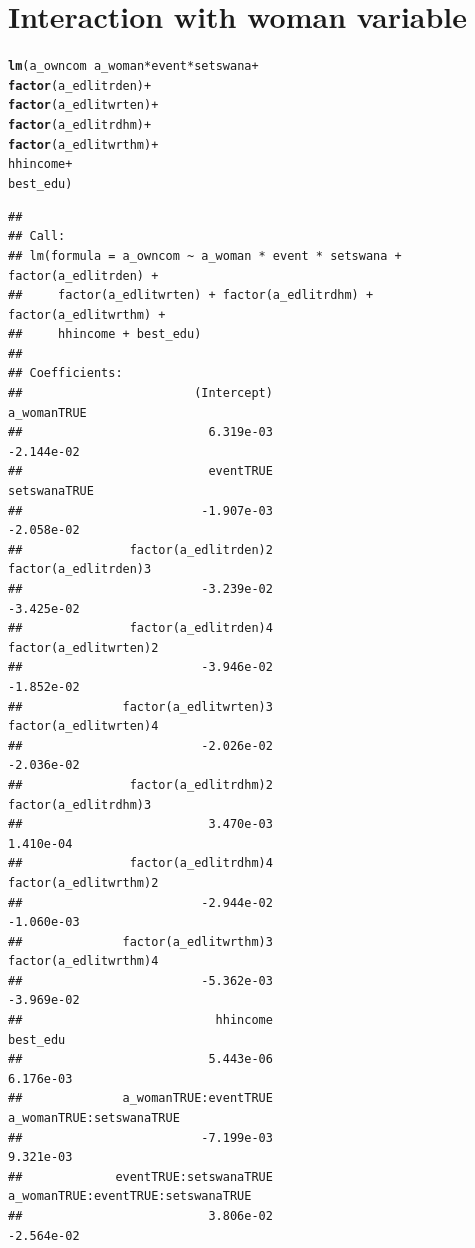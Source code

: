 \documentclass[a4paper,british]{article}\usepackage[]{graphicx}\usepackage[]{color}
\makeatletter
\newcommand{\hlopt}[1]{\textcolor[rgb]{0,0,0}{#1}}%
\newcommand{\hlstd}[1]{\textcolor[rgb]{0.345,0.345,0.345}{#1}}%
\newcommand{\hlkwd}[1]{\textcolor[rgb]{0.737,0.353,0.396}{\textbf{#1}}}%
\newenvironment{kframe}{%
 \def\at@end@of@kframe{}%
 \ifinner\ifhmode%
  \def\at@end@of@kframe{\end{minipage}}%
  \begin{minipage}{\columnwidth}%
 \fi\fi%
 \def\FrameCommand##1{\hskip\@totalleftmargin \hskip-\fboxsep
 \colorbox{shadecolor}{##1}\hskip-\fboxsep
     \hskip-\linewidth \hskip-\@totalleftmargin \hskip\columnwidth}%
 \MakeFramed {\advance\hsize-\width
   \@totalleftmargin\z@ \linewidth\hsize
   \@setminipage}}%
 {\par\unskip\endMakeFramed%
 \at@end@of@kframe}
\newenvironment{knitrout}{}{} %
\makeatother
\begin{document}
\section{Interaction with woman variable}

\begin{table}[H]
\caption{Women Owning a Computer}

\begin{knitrout}
\color{fgcolor}\begin{kframe}
\begin{alltt}
\hlkwd{lm}\hlstd{(a_owncom} \hlopt{~} \hlstd{a_woman}\hlopt{*}\hlstd{event}\hlopt{*}\hlstd{setswana} \hlopt{+}
              \hlkwd{factor}\hlstd{(a_edlitrden)}    \hlopt{+}
              \hlkwd{factor}\hlstd{(a_edlitwrten)}   \hlopt{+}
              \hlkwd{factor}\hlstd{(a_edlitrdhm)}    \hlopt{+}
              \hlkwd{factor}\hlstd{(a_edlitwrthm)}   \hlopt{+}
              \hlstd{hhincome}               \hlopt{+}
              \hlstd{best_edu                )}
\end{alltt}
\begin{verbatim}
## 
## Call:
## lm(formula = a_owncom ~ a_woman * event * setswana + factor(a_edlitrden) + 
##     factor(a_edlitwrten) + factor(a_edlitrdhm) + factor(a_edlitwrthm) + 
##     hhincome + best_edu)
## 
## Coefficients:
##                        (Intercept)                         a_womanTRUE  
##                          6.319e-03                          -2.144e-02  
##                          eventTRUE                        setswanaTRUE  
##                         -1.907e-03                          -2.058e-02  
##               factor(a_edlitrden)2                factor(a_edlitrden)3  
##                         -3.239e-02                          -3.425e-02  
##               factor(a_edlitrden)4               factor(a_edlitwrten)2  
##                         -3.946e-02                          -1.852e-02  
##              factor(a_edlitwrten)3               factor(a_edlitwrten)4  
##                         -2.026e-02                          -2.036e-02  
##               factor(a_edlitrdhm)2                factor(a_edlitrdhm)3  
##                          3.470e-03                           1.410e-04  
##               factor(a_edlitrdhm)4               factor(a_edlitwrthm)2  
##                         -2.944e-02                          -1.060e-03  
##              factor(a_edlitwrthm)3               factor(a_edlitwrthm)4  
##                         -5.362e-03                          -3.969e-02  
##                           hhincome                            best_edu  
##                          5.443e-06                           6.176e-03  
##              a_womanTRUE:eventTRUE            a_womanTRUE:setswanaTRUE  
##                         -7.199e-03                           9.321e-03  
##             eventTRUE:setswanaTRUE  a_womanTRUE:eventTRUE:setswanaTRUE  
##                          3.806e-02                          -2.564e-02
\end{verbatim}
\end{kframe}
\end{knitrout}
\end{table}
\end{document}
